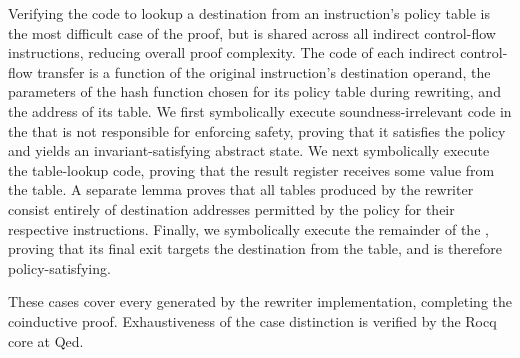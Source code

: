 Verifying the code to lookup a destination from an instruction's policy table is the most difficult case of the proof,
but is shared across all indirect control-flow instructions, reducing overall proof complexity.
The code of each indirect control-flow transfer \Block is a function of the original instruction's destination operand, the parameters of the hash function chosen for its policy table during rewriting, and the address of its table.
We first symbolically execute soundness-irrelevant code in the \Block that is not responsible for enforcing safety, proving that it satisfies the policy and yields an invariant-satisfying abstract state.
We next symbolically execute the table-lookup code, proving that the result register receives some value from the table.
A separate lemma proves that all tables produced by the rewriter consist entirely of destination addresses permitted by the policy for their respective instructions.
Finally, we symbolically execute the remainder of the \Block, proving that its final exit targets the destination from the table, and is therefore policy-satisfying.

\vspace{.5ex}

These cases cover every \Block generated by the rewriter implementation, completing the coinductive proof.
Exhaustiveness of the case distinction is verified by the Rocq core at Qed\@.
